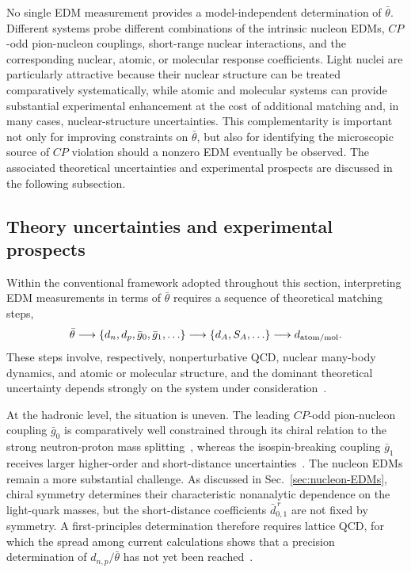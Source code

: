 \documentclass[review]{elsarticle}
\numberwithin{equation}{section}
\numberwithin{table}{section}
\numberwithin{figure}{section}
\begin{document}
No single EDM measurement provides a model-independent determination of $\bar\theta$. Different systems probe different combinations of the intrinsic nucleon EDMs, $CP$-odd pion-nucleon couplings, short-range nuclear interactions, and the corresponding nuclear, atomic, or molecular response coefficients. Light nuclei are particularly attractive because their nuclear structure can be treated comparatively systematically, while atomic and molecular systems can provide substantial experimental enhancement at the cost of additional matching and, in many cases, nuclear-structure uncertainties. This complementarity is important not only for improving constraints on $\bar\theta$, but also for identifying the microscopic source of $CP$ violation should a nonzero EDM eventually be observed. The associated theoretical uncertainties and experimental prospects are discussed in the following subsection.


\subsection{Theory uncertainties and experimental prospects}
\label{sec:EDM-uncertainties-prospects}

Within the conventional framework adopted throughout this section, interpreting EDM measurements in terms of $\bar\theta$ requires a sequence of theoretical matching steps,
\begin{align}
    \bar\theta 
    \longrightarrow
    \left\{d_n,d_p,\bar g_0,\bar g_1,\ldots\right\}
    \longrightarrow
    \left\{d_A,S_A,\ldots\right\}
    \longrightarrow
    d_{\rm atom/mol}.
    \label{eq:EDM-matching-chain}
\end{align}
These steps involve, respectively, nonperturbative QCD, nuclear many-body dynamics, and atomic or molecular structure, and the dominant theoretical uncertainty depends strongly on the system under consideration~\cite{Engel:2013lsa,Chupp:2017rkp,Pospelov:2025vzj,deVries:2026quu}.

At the hadronic level, the situation is uneven. The leading $CP$-odd pion-nucleon coupling $\bar g_0$ is comparatively well constrained through its chiral relation to the strong neutron-proton mass splitting~\cite{Mereghetti:2010tp,deVries:2015una}, whereas the isospin-breaking coupling $\bar g_1$ receives larger higher-order and short-distance uncertainties~\cite{Bsaisou:2012rg,Mulder:2025esr}. The nucleon EDMs remain a more substantial challenge. As discussed in Sec.~\ref{sec:nucleon-EDMs}, chiral symmetry determines their characteristic nonanalytic dependence on the light-quark masses, but the short-distance coefficients $\bar d_{0,1}^{\,r}$ are not fixed by symmetry. A first-principles determination therefore requires lattice QCD, for which the spread among current calculations shows that a precision determination of $d_{n,p}/\bar\theta$ has not yet been reached~\cite{Liu:2024kqy,Blum:2026hul}.
\end{document}
